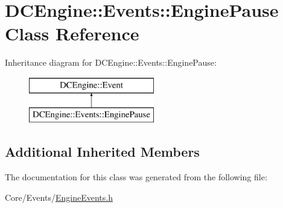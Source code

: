 \hypertarget{classDCEngine_1_1Events_1_1EnginePause}{\section{D\-C\-Engine\-:\-:Events\-:\-:Engine\-Pause Class Reference}
\label{classDCEngine_1_1Events_1_1EnginePause}
}
Inheritance diagram for D\-C\-Engine\-:\-:Events\-:\-:Engine\-Pause\-:\begin{figure}[H]
\begin{center}
\leavevmode
\includegraphics[height=2.000000cm]{classDCEngine_1_1Events_1_1EnginePause}
\end{center}
\end{figure}
\subsection*{Additional Inherited Members}


The documentation for this class was generated from the following file\-:\begin{DoxyCompactItemize}
\item 
Core/\-Events/\hyperlink{EngineEvents_8h}{Engine\-Events.\-h}\end{DoxyCompactItemize}
